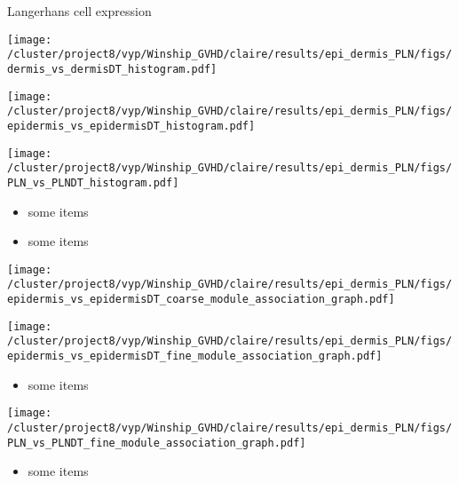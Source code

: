 \documentclass[final,hyperref={pdfpagelabels=false}]{beamer}
\begin{document}
\begin{frame}{}
\begin{columns}[t]
\begin{column}{.25\linewidth}
\begin{block}{Langerhans cell expression}
	  \begin{minipage}{0.45\textwidth}
            \texttt{[image: /cluster/project8/vyp/Winship\_GVHD/claire/results/epi\_dermis\_PLN/figs/dermis\_vs\_dermisDT\_histogram.pdf]}
          \end{minipage}
          \begin{minipage}{0.45\textwidth}
            \texttt{[image: /cluster/project8/vyp/Winship\_GVHD/claire/results/epi\_dermis\_PLN/figs/epidermis\_vs\_epidermisDT\_histogram.pdf]}
          \end{minipage}
          \begin{minipage}{0.45\textwidth}
            \texttt{[image: /cluster/project8/vyp/Winship\_GVHD/claire/results/epi\_dermis\_PLN/figs/PLN\_vs\_PLNDT\_histogram.pdf]}
          \end{minipage}
{\small          \begin{itemize}
            \item some items
            \item some items
           \end{itemize}}
	  \begin{minipage}{0.45\textwidth}
            \texttt{[image: /cluster/project8/vyp/Winship\_GVHD/claire/results/epi\_dermis\_PLN/figs/epidermis\_vs\_epidermisDT\_coarse\_module\_association\_graph.pdf]}
          \end{minipage}

	  \begin{minipage}{0.45\textwidth}
            \texttt{[image: /cluster/project8/vyp/Winship\_GVHD/claire/results/epi\_dermis\_PLN/figs/epidermis\_vs\_epidermisDT\_fine\_module\_association\_graph.pdf]}
          \end{minipage}
{\small	  \begin{itemize}
	    \item some items
	   \end{itemize}}
	  \begin{minipage}{0.45\textwidth}
            \texttt{[image: /cluster/project8/vyp/Winship\_GVHD/claire/results/epi\_dermis\_PLN/figs/PLN\_vs\_PLNDT\_fine\_module\_association\_graph.pdf]}
          \end{minipage}


{\small
	  \begin{itemize}
            \item some items
           \end{itemize}}
        \end{block}
      \end{column}


    \end{columns}
  \end{frame}
\end{document}
